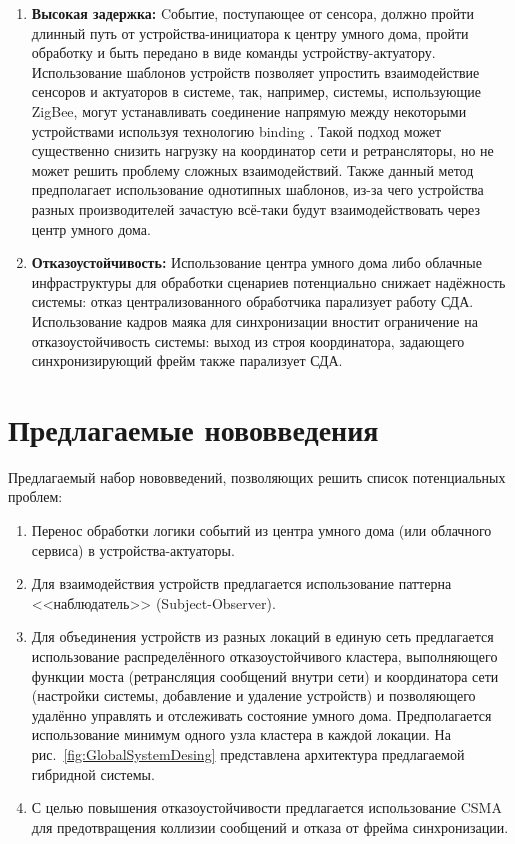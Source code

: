 \documentclass[14pt, a4paper]{extreport}
\begin{document}
\begin{enumerate}
   \item \textbf{Высокая задержка:} Cобытие, поступающее от сенсора, должно пройти длинный путь от устройства-инициатора к центру умного
   дома, пройти обработку и быть передано в виде команды устройству-актуатору. Использование шаблонов устройств позволяет упростить взаимодействие сенсоров и актуаторов в системе,
   так, например, системы, использующие ZigBee, могут устанавливать соединение напрямую между некоторыми устройствами используя технологию binding \cite{ZIGBEE_SPEC_R23}. Такой подход
   может существенно снизить нагрузку на координатор сети и ретрансляторы, но не может решить проблему сложных взаимодействий. Также данный метод предполагает использование однотипных
   шаблонов, из-за чего устройства разных производителей зачастую всё-таки будут взаимодействовать через центр умного дома.
   
   \item \textbf{Отказоустойчивость:} Использование центра умного дома либо облачные инфраструктуры для обработки сценариев потенциально снижает надёжность системы: отказ
   централизованного обработчика парализует работу СДА. Использование кадров маяка для синхронизации вностит ограничение на отказоустойчивость системы: выход из строя координатора,
   задающего синхронизирующий фрейм также парализует СДА.
\end{enumerate}

\section{Предлагаемые нововведения}

Предлагаемый набор нововведений, позволяющих решить список потенциальных проблем:
\begin{enumerate}
\item Перенос обработки логики событий из центра умного дома (или облачного сервиса) в устройства-актуаторы.
\item Для взаимодействия устройств предлагается использование паттерна <<наблюдатель>> (Subject-Observer).
\item Для объединения устройств из разных локаций в единую сеть предлагается использование распределённого отказоустойчивого кластера, выполняющего
функции моста (ретрансляция сообщений внутри сети) и координатора сети (настройки системы, добавление и удаление устройств) и позволяющего удалённо управлять и отслеживать состояние
умного дома. Предполагается использование минимум одного узла кластера в каждой локации. На рис.~\ref{fig:GlobalSystemDesing} представлена архитектура предлагаемой гибридной системы.
\item С целью повышения отказоустойчивости предлагается использование CSMA \cite{CSMA_article} для предотвращения коллизии сообщений и отказа от фрейма синхронизации.
\end{enumerate}
\end{document}

